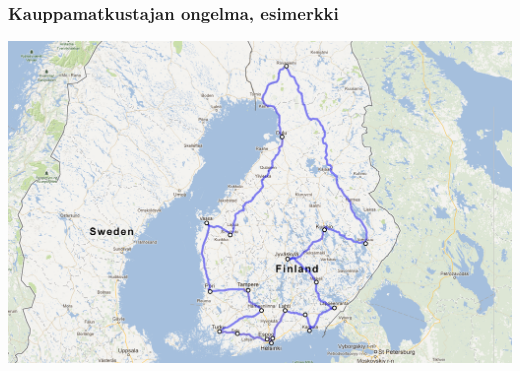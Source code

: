 \documentclass{beamer}
\begin{document}
        \begin{frame}
  \frametitle{Kauppamatkustajan ongelma, esimerkki}   %
\centering
\includegraphics[scale=0.25]{tspdemo02}
    \end{frame}
    

% 
\end{document}

